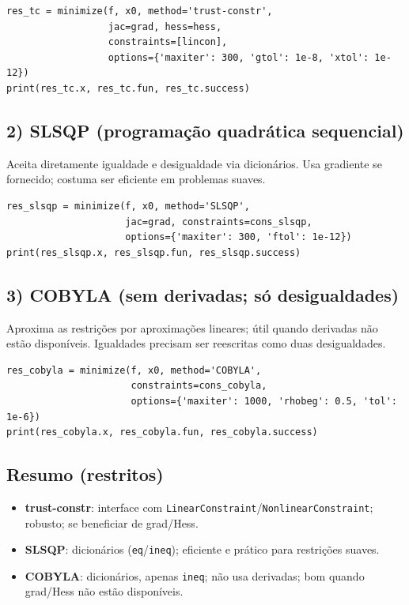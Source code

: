 \documentclass[9pt,a4paper]{extarticle}
\begin{document}
\begin{lstlisting}
res_tc = minimize(f, x0, method='trust-constr',
                  jac=grad, hess=hess,
                  constraints=[lincon],
                  options={'maxiter': 300, 'gtol': 1e-8, 'xtol': 1e-12})
print(res_tc.x, res_tc.fun, res_tc.success)
\end{lstlisting}

\subsection*{2) SLSQP (programação quadrática sequencial)}
Aceita diretamente igualdade e desigualdade via dicionários. Usa gradiente se fornecido; costuma ser eficiente em problemas suaves.

\begin{lstlisting}
res_slsqp = minimize(f, x0, method='SLSQP',
                     jac=grad, constraints=cons_slsqp,
                     options={'maxiter': 300, 'ftol': 1e-12})
print(res_slsqp.x, res_slsqp.fun, res_slsqp.success)
\end{lstlisting}

\subsection*{3) COBYLA (sem derivadas; só desigualdades)}
Aproxima as restrições por aproximações lineares; útil quando derivadas não estão disponíveis. Igualdades precisam ser reescritas como duas desigualdades.

\begin{lstlisting}
res_cobyla = minimize(f, x0, method='COBYLA',
                      constraints=cons_cobyla,
                      options={'maxiter': 1000, 'rhobeg': 0.5, 'tol': 1e-6})
print(res_cobyla.x, res_cobyla.fun, res_cobyla.success)
\end{lstlisting}

\subsection*{Resumo (restritos)}
\begin{itemize}
    \item \textbf{trust-constr}: interface com \texttt{LinearConstraint}/\texttt{NonlinearConstraint}; robusto; se beneficiar de grad/Hess.
    \item \textbf{SLSQP}: dicionários (\texttt{eq}/\texttt{ineq}); eficiente e prático para restrições suaves.
    \item \textbf{COBYLA}: dicionários, apenas \texttt{ineq}; não usa derivadas; bom quando grad/Hess não estão disponíveis.
\end{itemize}
\end{document}
